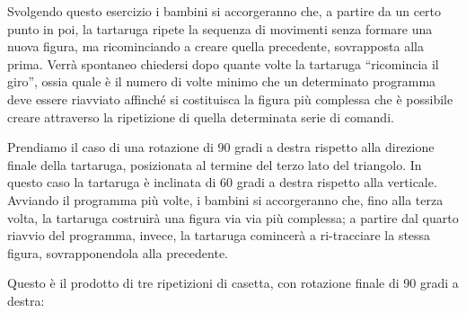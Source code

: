 Svolgendo questo esercizio i bambini si accorgeranno che, a partire da un certo
punto in poi, la tartaruga ripete la sequenza di movimenti senza formare una
nuova figura, ma ricominciando a creare quella precedente, sovrapposta alla
prima. Verrà spontaneo chiedersi dopo quante volte la tartaruga “ricomincia il
giro”, ossia quale è il numero di volte minimo che un determinato programma
deve essere riavviato affinché si costituisca la figura più complessa che è
possibile creare attraverso la ripetizione di quella determinata serie di
comandi. 

Prendiamo il caso di una rotazione di 90 gradi a destra rispetto alla direzione
finale della tartaruga, posizionata al termine del terzo lato del triangolo. In
questo caso la tartaruga è inclinata di 60 gradi a destra rispetto alla
verticale. Avviando il programma più volte, i bambini si accorgeranno che, fino
alla terza volta, la tartaruga costruirà una figura via via più complessa; a
partire dal quarto riavvio del programma, invece, la tartaruga comincerà a
ri-tracciare la stessa figura, sovrapponendola alla precedente.

Questo è il prodotto di tre ripetizioni di casetta, con rotazione finale di 90
gradi a destra:

